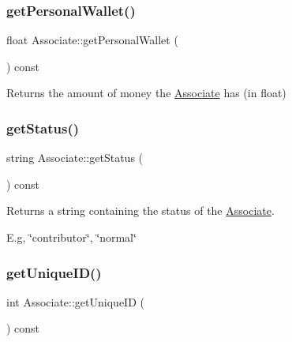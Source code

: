 \mbox{\label{classAssociate_a75ad2c5af6c2a21fb1828f785751f390}} 
\subsubsection{\texorpdfstring{get\+Personal\+Wallet()}{getPersonalWallet()}}
{\footnotesize\ttfamily float Associate\+::get\+Personal\+Wallet (\begin{DoxyParamCaption}{ }\end{DoxyParamCaption}) const}



Returns the amount of money the \mbox{\hyperlink{classAssociate}{Associate}} has (in float) 

\mbox{\label{classAssociate_a9f6109b8164cf8193f9fabd5ff2871f7}} 
\subsubsection{\texorpdfstring{get\+Status()}{getStatus()}}
{\footnotesize\ttfamily string Associate\+::get\+Status (\begin{DoxyParamCaption}{ }\end{DoxyParamCaption}) const}



Returns a string containing the status of the \mbox{\hyperlink{classAssociate}{Associate}}. 

E.\+g, \char`\"{}contributor\char`\"{}, \char`\"{}normal\char`\"{} \mbox{\label{classAssociate_aaca11bf6dea5df3710931898e00a0944}} 
\subsubsection{\texorpdfstring{get\+Unique\+I\+D()}{getUniqueID()}}
{\footnotesize\ttfamily int Associate\+::get\+Unique\+ID (\begin{DoxyParamCaption}{ }\end{DoxyParamCaption}) const}



